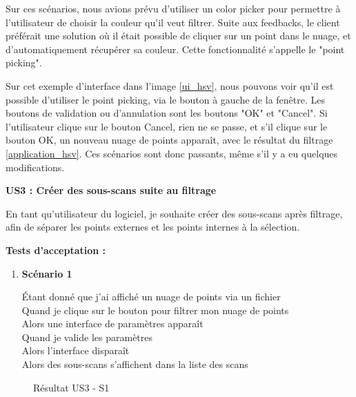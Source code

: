 \documentclass[12pt,titlepage,french]{article}
\begin{document}
Sur ces scénarios, nous avions prévu d'utiliser un color picker pour permettre à l'utilisateur de choisir la couleur qu'il veut filtrer. Suite aux feedbacks, le client préférait une solution où il était possible de cliquer sur un point dans le nuage, et d'automatiquement récupérer sa couleur. Cette fonctionnalité s'appelle le "point picking". \newline

Sur cet exemple d'interface dans l'image \ref{ui_hsv}, nous pouvons voir qu'il est possible d'utiliser le point picking, via le bouton à gauche de la fenêtre. Les boutons de validation ou d'annulation sont les boutons "OK" et "Cancel". Si l'utilisateur clique sur le bouton Cancel, rien ne se passe, et s'il clique sur le bouton OK, un nouveau nuage de points apparaît, avec le résultat du filtrage \ref{application_hsv}. Ces scénarios sont donc passants, même s'il y a eu quelques modifications. \newline

\textbf{\og US3 : Créer des sous-scans suite au filtrage\fg{}}

En tant qu'utilisateur du logiciel, je souhaite créer des sous-scans après filtrage, afin de séparer les points externes et les points internes à la sélection.

\textbf{Tests d'acceptation :}
\begin{enumerate}

    \item \textbf{Scénario 1}

Étant donné que j'ai affiché un nuage de points via un fichier\\
Quand je clique sur le bouton pour filtrer mon nuage de points\\
Alors une interface de paramètres apparaît\\
Quand je valide les paramètres\\
Alors l'interface disparaît\\
Alors des sous-scans s'affichent dans la liste des scans
\end{enumerate}

\begin{figure}[H]
    \caption{\label{} Résultat US3 - S1}
\end{figure}
\end{document}
